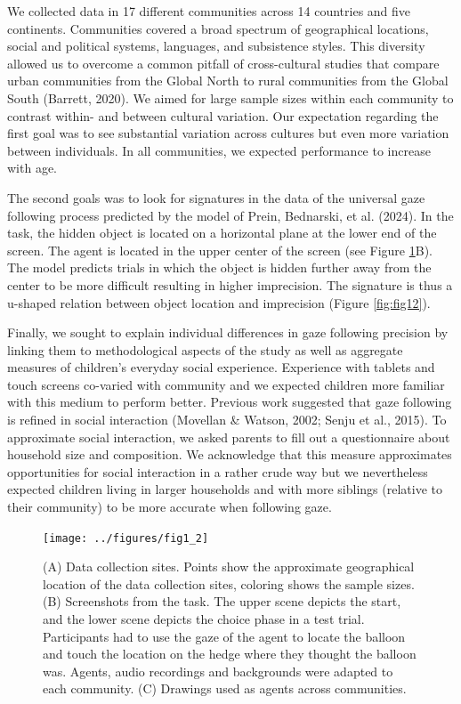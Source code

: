 \documentclass[
  man,floatsintext]{apa7}
\begin{document}
We collected data in 17 different communities across 14 countries and five continents. Communities covered a broad spectrum of geographical locations, social and political systems, languages, and subsistence styles. This diversity allowed us to overcome a common pitfall of cross-cultural studies that compare urban communities from the Global North to rural communities from the Global South (Barrett, 2020). We aimed for large sample sizes within each community to contrast within- and between cultural variation. Our expectation regarding the first goal was to see substantial variation across cultures but even more variation between individuals. In all communities, we expected performance to increase with age.

The second goals was to look for signatures in the data of the universal gaze following process predicted by the model of Prein, Bednarski, et al. (2024). In the task, the hidden object is located on a horizontal plane at the lower end of the screen. The agent is located in the upper center of the screen (see Figure \ref{fig:fig1}B). The model predicts trials in which the object is hidden further away from the center to be more difficult resulting in higher imprecision. The signature is thus a u-shaped relation between object location and imprecision (Figure \ref{fig:fig12}).

Finally, we sought to explain individual differences in gaze following precision by linking them to methodological aspects of the study as well as aggregate measures of children's everyday social experience. Experience with tablets and touch screens co-varied with community and we expected children more familiar with this medium to perform better. Previous work suggested that gaze following is refined in social interaction (Movellan \& Watson, 2002; Senju et al., 2015). To approximate social interaction, we asked parents to fill out a questionnaire about household size and composition. We acknowledge that this measure approximates opportunities for social interaction in a rather crude way but we nevertheless expected children living in larger households and with more siblings (relative to their community) to be more accurate when following gaze.

\begin{figure}

{\centering \texttt{[image: ../figures/fig1\_2]} 

}

\caption{(A) Data collection sites. Points show the approximate geographical location of the data collection sites, coloring shows the sample sizes. (B) Screenshots from the task. The upper scene depicts the start, and the lower scene depicts the choice phase in a test trial. Participants had to use the gaze of the agent to locate the balloon and touch the location on the hedge where they thought the balloon was. Agents, audio recordings and backgrounds were adapted to each community. (C) Drawings used as agents across communities.}\label{fig:fig1}
\end{figure}
\end{document}
